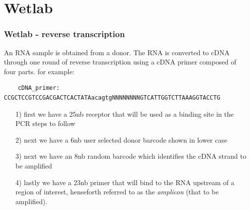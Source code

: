 \documentclass{beamer}
\newcommand{\pdfnarration}[1]{%
\onslide*<\value{beamerpauses}>{\pdfmargincomment[style=note,author=narration]{#1}}%
}
\renewcommand{\pdfnarration}[1]{}
\begin{document}
\section{Wetlab}

\begin{frame}[fragile]
\frametitle{ Wetlab - reverse transcription }

\alert<1> 


\bigskip
An RNA sample is obtained from a donor. The RNA is
converted to cDNA through one round of reverse transcription using 
a cDNA primer composed of four parts. for example:

\tiny
\begin{verbatim}
    cDNA_primer: CCGCTCCGTCCGACGACTCACTATAacagtgNNNNNNNNGTCATTGGTCTTAAAGGTACCTG
\end{verbatim}
\normalsize

\begin{itemize}
\item[1)] first we have a 25nb receptor that will be used as a binding site in the PCR steps to follow
\item[2)] next we have a 6nb user selected donor barcode shown in lower case
\item[3)] next we have an 8nb random barcode which identifies the cDNA strand to be amplified
\item[4)] lastly we have a 23nb primer that will bind to the RNA upstream of a region of interest, henseforth referred to as the {\em amplicon} (that to be amplified).
\end{itemize}

\pdfnarration{
[[slnc 1000]]
In order to comprehend the pipeline, we must first get an understanding
of the wetlab procedures that are used to generate the sequences for PacBio processing.
[[sinc 2000]]
An RNA sample is obtained from a donor. 
[[sinc 2000]]
The RNA is converted to CDNA through one round of 
reverse-transcription using a primer, such as the one shown in the slide.
[[sinc 2000]]
In this example the first 25 base pairs provide a binding site for subsequent PCR amplification.
[[sinc 2000]]
The next 6 base pairs ( in lower case ) provide a barcode identifying the donor.
[[sinc 2000]]
The next 8 base pairs ( the Ns ) represent a randomly generated barcode that identifies the ampli-con.
[[sinc 2000]]
The last 23 base pairs, on reversal, provide a primer that will bind to the RNA upstream of the ampli-con.
[[sinc 1000]]
}




\end{frame}
\end{document}
